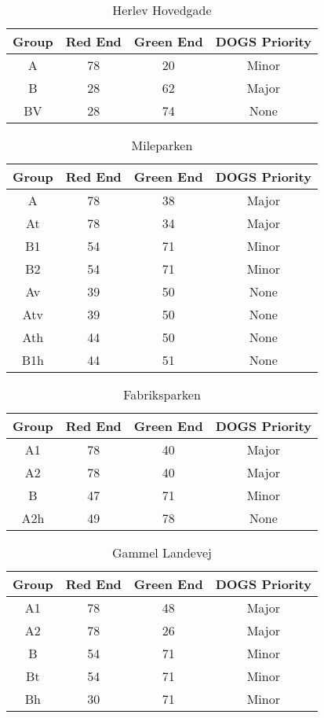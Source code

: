 \begin{table}[ht]
\centering
\begin{tabular}{c|c|c|c}
\textbf{Group} & \textbf{Red End} & \textbf{Green End} & \textbf{DOGS Priority}\\ \hline
A & 78 & 20 & Minor\\
B & 28 & 62 & Major\\
BV & 28 & 74 & None\\
\end{tabular}
\caption{Herlev Hovedgade}
\end{table}

\begin{table}[ht]
\centering
\begin{tabular}{c|c|c|c}
\textbf{Group} & \textbf{Red End} & \textbf{Green End} & \textbf{DOGS Priority}\\ \hline
A & 78 & 38 & Major\\
At & 78 & 34 & Major\\
B1 & 54 & 71 & Minor\\
B2 & 54 & 71 & Minor\\
Av & 39 & 50 & None\\
Atv & 39 & 50 & None\\
Ath & 44 & 50 & None\\
B1h & 44 & 51 & None\\
\end{tabular}
\caption{Mileparken}
\end{table}

\begin{table}[ht]
\centering
\begin{tabular}{c|c|c|c}
\textbf{Group} & \textbf{Red End} & \textbf{Green End} & \textbf{DOGS Priority}\\ \hline
A1 & 78 & 40 & Major\\
A2 & 78 & 40 & Major\\
B & 47 & 71 & Minor\\
A2h & 49 & 78 & None\\
\end{tabular}
\caption{Fabriksparken}
\end{table}

\begin{table}[ht]
\centering
\begin{tabular}{c|c|c|c}
\textbf{Group} & \textbf{Red End} & \textbf{Green End} & \textbf{DOGS Priority}\\ \hline
A1 & 78 & 48 & Major\\
A2 & 78 & 26 & Major\\
B & 54 & 71 & Minor\\
Bt & 54 & 71 & Minor\\
Bh & 30 & 71 & Minor\\
\end{tabular}
\caption{Gammel Landevej}
\end{table}

